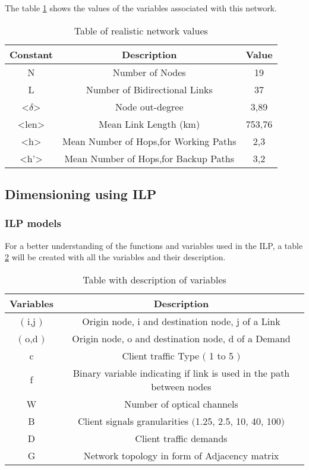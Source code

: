 \vspace{20pt}

\begin{table}[h!]
The table \ref{table:2} shows the values of the variables associated with this network.\vspace{10pt}
\centering
\begin{tabular}{|| c | c | c||}
 \hline
 Constant & Description & Value \\
 \hline\hline
 N & Number of Nodes & 19 \\
 L & Number of Bidirectional Links & 37 \\
 <$\delta$> & Node out-degree & 3,89 \\
 <len> & Mean Link Length (km) & 753,76 \\
 <h> & Mean Number of Hops,for Working Paths & 2,3 \\
 <h'> & Mean Number of Hops,for Backup Paths & 3,2 \\
 \hline
\end{tabular}
\caption{Table of realistic network values}
\label{table:2}
\end{table}

\vspace{10pt}

\subsection{Dimensioning using ILP}
\vspace{10pt}
\subsubsection{ILP models}\label{ILP_models_OP}

For a better understanding of the functions and variables used in the ILP, a table \ref{description_opaque} will be created with all the variables and their description. \\

\begin{table}[h!]
\centering
\begin{tabular}{|| c | c||}
 \hline
 Variables & Description \\
 \hline\hline
 $($ i,j $)$ & Origin node, i and destination node, j of a Link \\
 $($ o,d $)$ & Origin node, o and destination node, d of a Demand \\
 c & Client traffic Type $($ 1 to 5 $)$ \\
 f & Binary variable indicating if link is used in the path between nodes \\
 W & Number of optical channels \\
 B & Client signals granularities $($1.25, 2.5, 10, 40, 100$)$ \\
 D & Client traffic demands \\
 G & Network topology in form of Adjacency matrix \\
 \hline
\end{tabular}
\caption{Table with description of variables}
\label{description_opaque}
\end{table}

